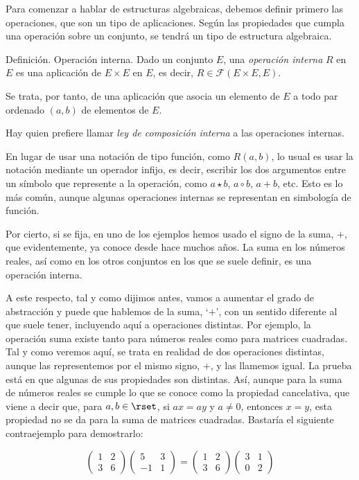 



Para comenzar a hablar de estructuras algebraicas, debemos definir primero
las operaciones, que son un tipo de aplicaciones. Según las propiedades que
cumpla una operación sobre un conjunto, se tendrá un tipo de estructura
algebraica.

Definición. Operación interna. Dado un conjunto $E$, una \emph{operación
interna} $R$ en $E$ es una aplicación de $E \times E$ en $E$, es decir, $R
\in \mathcal{F}(E \times E, E)$.

Se trata, por tanto, de una aplicación que asocia un elemento de $E$ a todo
par ordenado $(a, b)$ de elementos de $E$.

Hay quien prefiere llamar \emph{ley de composición interna} a las
operaciones internas.



En lugar de usar una notación de tipo función, como $R(a, b)$, lo usual es
usar la notación mediante un operador infijo, es decir, escribir los dos
argumentos entre un símbolo que represente a la operación, como $a \star b$,
$a \circ b$, $a + b$, etc. Esto es lo más común, aunque algunas operaciones
internas se representan en simbología de función.

Por cierto, si se fija, en uno de los ejemplos hemos usado el signo de la
suma, $+$, que evidentemente, ya conoce desde hace muchos años. La suma en
los números reales, así como en los otros conjuntos en los que se suele
definir, es una operación interna.

A este respecto, tal y como dijimos antes, vamos a aumentar el grado de
abstracción y puede que hablemos de la suma, `$+$', con un sentido diferente
al que suele tener, incluyendo aquí a operaciones distintas. Por ejemplo, la
operación suma existe tanto para números reales como para matrices
cuadradas. Tal y como veremos aquí, se trata en realidad de dos operaciones
distintas, aunque las representemos por el mismo signo, $+$, y las llamemos
igual. La prueba está en que algunas de sus propiedades son distintas. Así,
aunque para la suma de números reales se cumple lo que se conoce como la
propiedad cancelativa, que viene a decir que, para $a, b \in \rset$, si $ax
= ay$ y $a \neq 0$, entonces $x = y$, esta propiedad no se da para la suma
de matrices cuadradas. Bastaría el siguiente contraejemplo para demostrarlo:

$$
  \begin{pmatrix}
  1 & 2 \\
  3 & 6
  \end{pmatrix}
  \begin{pmatrix}
  5 & 3 \\
  -1 & 1
  \end{pmatrix}
  =
  \begin{pmatrix}
  1 & 2 \\
  3 & 6
  \end{pmatrix}
  \begin{pmatrix}
  3 & 1 \\
  0 & 2
  \end{pmatrix}
$$


